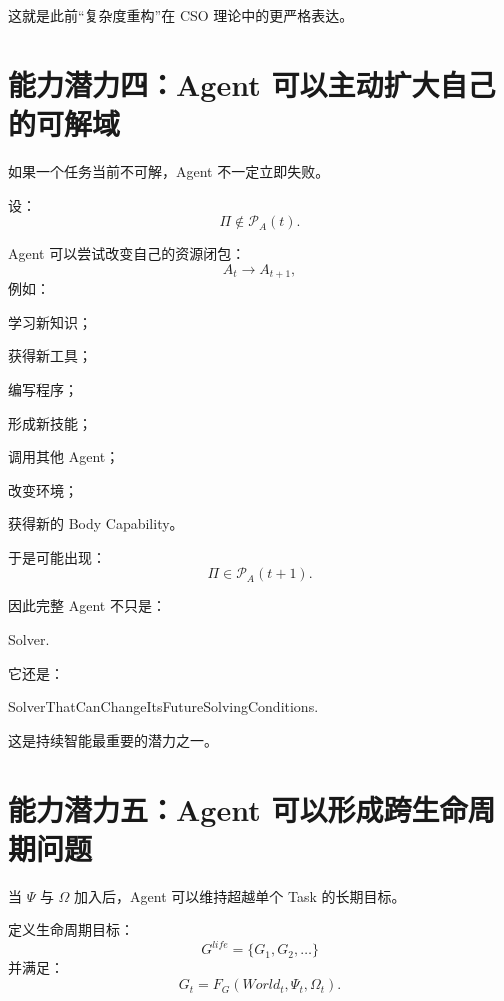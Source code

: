 这就是此前“复杂度重构”在 CSO 理论中的更严格表达。

\section{能力潜力四：Agent 可以主动扩大自己的可解域}

如果一个任务当前不可解，Agent 不一定立即失败。

设：
\begin{equation}
\Pi
\notin
\mathscr P_A(t).
\end{equation}

Agent 可以尝试改变自己的资源闭包：
\begin{equation}
A_t
\rightarrow
A_{t+1},
\end{equation}
例如：

学习新知识；

获得新工具；

编写程序；

形成新技能；

调用其他 Agent；

改变环境；

获得新的 Body Capability。

于是可能出现：
\begin{equation}
\Pi
\in
\mathscr P_A(t+1).
\end{equation}

因此完整 Agent 不只是：
\begin{statementbox}
Solver.
\end{statementbox}

它还是：
\begin{statementbox}
SolverThatCanChangeItsFutureSolvingConditions.
\end{statementbox}

这是持续智能最重要的潜力之一。

\section{能力潜力五：Agent 可以形成跨生命周期问题}

当 $\Psi$ 与 $\Omega$ 加入后，Agent 可以维持超越单个 Task 的长期目标。

定义生命周期目标：
\begin{equation}
G^{life}
=
\{G_1,G_2,\ldots\}
\end{equation}
并满足：
\begin{equation}
G_t
=
F_G(
World_t,
\Psi_t,
\Omega_t
).
\end{equation}

